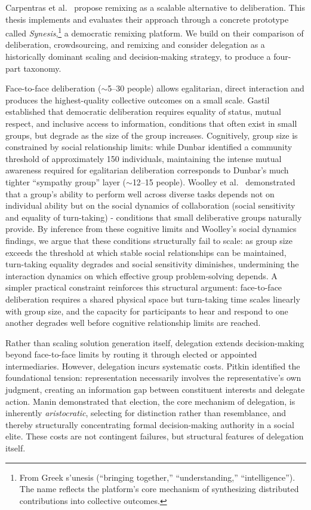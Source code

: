 \documentclass[a4paper, 12pt, twoside]{iviathesis}
\begin{document}
Carpentras et al.\ \cite{carpentras_wisdom_2025} propose remixing as a scalable alternative to deliberation. This thesis implements and evaluates their approach through a concrete prototype called \textit{Synesis},\footnote{From Greek \textgreek{s'unesis} (``bringing together,'' ``understanding,'' ``intelligence''). The name reflects the platform's core mechanism of synthesizing distributed contributions into collective outcomes.} a democratic remixing platform.
We build on their comparison of deliberation, crowdsourcing, and remixing and consider delegation as a historically dominant scaling and decision-making strategy, to produce a four-part taxonomy. 

Face-to-face deliberation ($\sim$5--30 people) allows egalitarian, direct interaction and produces the highest-quality collective outcomes on a small scale. Gastil \cite{gastil1993} established that democratic deliberation requires equality of status, mutual respect, and inclusive access to information, conditions that often exist in small groups, but degrade as the size of the group increases. Cognitively, group size is constrained by social relationship limits: while Dunbar \cite{dunbar1992neocortex} identified a community threshold of approximately 150 individuals, maintaining the intense mutual awareness required for egalitarian deliberation corresponds to Dunbar's much tighter ``sympathy group'' layer ($\sim$12--15 people). 
Woolley et al.\ \cite{woolley2010evidence} demonstrated that a group's ability to perform well across diverse tasks depends not on individual ability but on the social dynamics of collaboration (social sensitivity and equality of turn-taking) - conditions that small deliberative groups naturally provide. By inference from these cognitive limits and Woolley's social dynamics findings, we argue that these conditions structurally fail to scale: as group size exceeds the threshold at which stable social relationships can be maintained, turn-taking equality degrades and social sensitivity diminishes, undermining the interaction dynamics on which effective group problem-solving depends. A simpler practical constraint reinforces this structural argument: face-to-face deliberation requires a shared physical space but turn-taking time scales linearly with group size, and the capacity for participants to hear and respond to one another degrades well before cognitive relationship limits are reached.

Rather than scaling solution generation itself, delegation extends decision-making beyond face-to-face limits by routing it through elected or appointed intermediaries. However, delegation incurs systematic costs. Pitkin \cite{pitkin1967} identified the foundational tension: representation necessarily involves the representative's own judgment, creating an information gap between constituent interests and delegate action. Manin \cite{manin1997} demonstrated that election, the core mechanism of delegation, is inherently \textit{aristocratic}, selecting for distinction rather than resemblance, and thereby structurally concentrating formal decision-making authority in a social elite. These costs are not contingent failures, but structural features of delegation itself.
\end{document}
